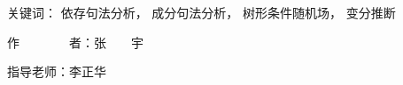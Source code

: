 \begin{cabstract}
  \vskip 21bp
    {\heiti{} 关键词：}
  依存句法分析，
  成分句法分析，
  树形条件随机场，
  变分推断

  \begin{flushright}
    作~~~~~~~~者：张~~~~宇

    指导老师：李正华

  \end{flushright}
\end{cabstract}


